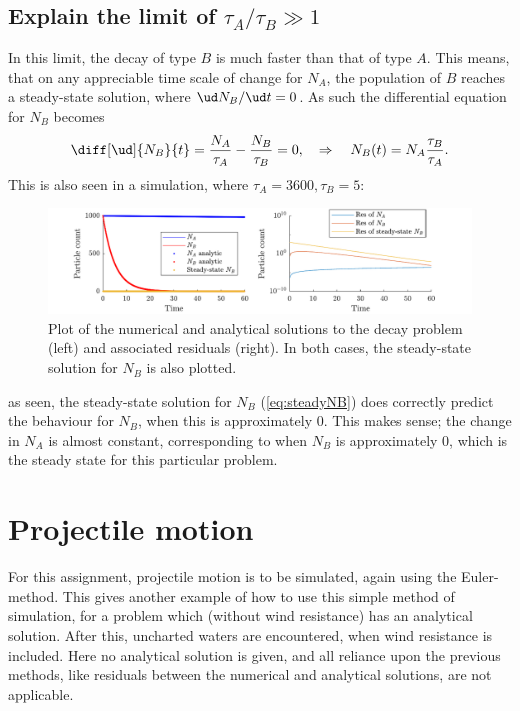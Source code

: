 \documentclass[a4paper,10pt]{article} 	%
\numberwithin{equation}{section}
\begin{document}
	\subsection{Explain the limit of $ \tau_A/\tau_B \gg 1 $}
	In this limit, the decay of type $ B $ is much faster than that of type $ A $. This means, that on any appreciable time scale of change for $ N_A $, the population of $ B $ reaches a steady-state solution, where $ \ud N_B/\ud t = 0 $. As such the differential equation for $ N_B $ becomes
	\begin{equation}\label{eq:steadyNB}
		\diff[\ud]{N_B}{t} = \frac{N_A}{\tau_A} - \frac{N_B}{\tau_B} = 0, \quad \Rightarrow \quad N_B(t) = N_A \frac{\tau_B}{\tau_A}.
	\end{equation}
	This is also seen in a simulation, where $ \tau_A = 3600,\tau_B = 5 $:
	\begin{figure}[H]
		\centering
		\includegraphics[width=\linewidth]{largetau.pdf}
		\caption{Plot of the numerical and analytical solutions to the decay problem (left) and associated residuals (right). In both cases, the steady-state solution for $ N_B $ is also plotted.}
		\label{fig:largeTau}
	\end{figure}
	as seen, the steady-state solution for $ N_B $ (\eqref{eq:steadyNB}) does correctly predict the behaviour for $ N_B $, when this is approximately 0. This makes sense; the change in $ N_A $ is almost constant, corresponding to when $ N_B $ is approximately 0, which is the steady state for this particular problem.
	
	
	\section{Projectile motion}
	For this assignment, projectile motion is to be simulated, again using the Euler-method. This gives another example of how to use this simple method of simulation, for a problem which (without wind resistance) has an analytical solution. After this, uncharted waters are encountered, when wind resistance is included. Here no analytical solution is given, and all reliance upon the previous methods, like residuals between the numerical and analytical solutions, are not applicable.
	
\end{document}
